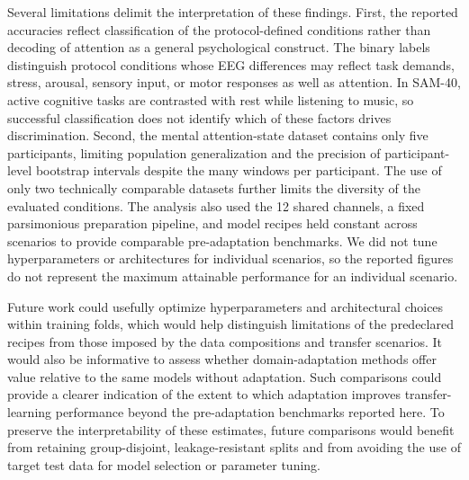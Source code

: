 \documentclass[10pt,letterpaper]{article}
\begin{document}
\medskip

Several limitations delimit the interpretation of these findings. First, the
reported accuracies reflect classification of the protocol-defined conditions
rather than decoding of attention as a general psychological construct. The
binary labels distinguish protocol conditions whose EEG differences may
reflect task demands, stress, arousal, sensory input, or motor responses as
well as attention. In SAM-40, active cognitive tasks are contrasted with rest
while listening to music, so successful classification does not identify
which of these factors drives discrimination. Second, the mental
attention-state dataset contains only five participants, limiting population
generalization and the precision of participant-level bootstrap intervals
despite the many windows per participant. The use of only two technically
comparable datasets further limits the diversity of the evaluated conditions. The analysis also used the 12 shared
channels, a fixed parsimonious preparation pipeline, and model recipes held
constant across scenarios to provide comparable pre-adaptation benchmarks.
We did not tune hyperparameters or architectures for individual scenarios, so
the reported figures do not represent the maximum attainable performance for
an individual scenario.

\medskip

Future work could usefully optimize hyperparameters and architectural choices
within training folds, which would help distinguish limitations of the
predeclared recipes from those imposed by the data compositions and transfer
scenarios. It would also be informative to assess whether domain-adaptation
methods offer value relative to the same models without adaptation. Such
comparisons could provide a clearer indication of the extent to which
adaptation improves transfer-learning performance beyond the pre-adaptation
benchmarks reported here. To preserve the interpretability of these estimates,
future comparisons would benefit from retaining group-disjoint,
leakage-resistant splits and from avoiding the use of target test data for
model selection or parameter tuning.

%
\end{document}
